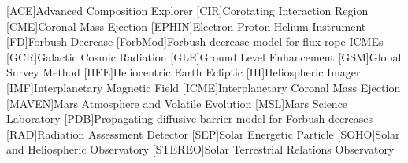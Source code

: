 	\begin{acronym}
	[ACE]{Advanced Composition Explorer}
	[CIR]{Corotating Interaction Region}
	[CME]{Coronal Mass Ejection}
	[EPHIN]{Electron Proton Helium Instrument}
	[FD]{Forbush Decrease}
	[ForbMod]{Forbush decrease model for flux rope ICMEs \cite{Dumbovic2018-ForbMod}}
	[GCR]{Galactic Cosmic Radiation}
	[GLE]{Ground Level Enhancement}
	[GSM]{Global Survey Method \cite{Belov-2005-GSM}}
	[HEE]{Heliocentric Earth Ecliptic}
	[HI]{Heliospheric Imager}
	[IMF]{Interplanetary Magnetic Field}
	[ICME]{Interplanetary Coronal Mass Ejection}
	[MAVEN]{Mars Atmosphere and Volatile Evolution}
	[MSL]{Mars Science Laboratory}
	[PDB]{Propagating diffusive barrier model for Forbush decreases \cite{Wibberenz-1998}}
	[RAD]{Radiation Assessment Detector}
	[SEP]{Solar Energetic Particle}
	[SOHO]{Solar and Heliospheric Observatory}
	[STEREO]{Solar Terrestrial Relations Observatory}
	\end{acronym}
	

\endgroup

\cleardoublepage